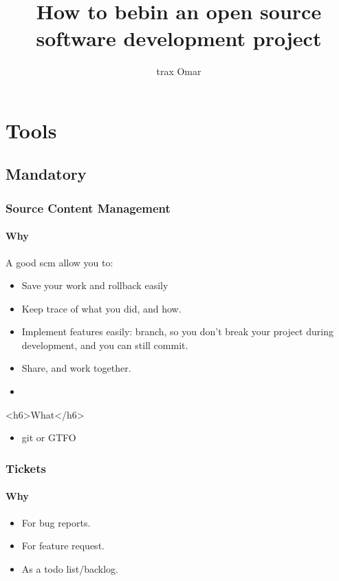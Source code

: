 \documentclass[a4paper, 12pt, twoside, openright]{article}
\author {trax Omar \bsc{Givernaud}}
\title{How to bebin an open source software development project}
\begin{document}
\maketitle
\thispagestyle{empty}
\clearpage
\tableofcontents{}
\thispagestyle{empty}
\clearpage

  \section{Tools}

  \subsection{Mandatory}
  \subsubsection{Source Content Management}

  \paragraph{Why}

  A good scm allow you to: 
  \begin{itemize}
    \item Save your work and rollback easily
    \item Keep trace of what you did, and how.
    \item Implement features easily: branch, 
      so you don't break your project during development, and you can still commit.
    \item Share, and work together.
    \item 
  \end{itemize}

  <h6>What</h6>

  \begin{itemize}\item git or GTFO\end{itemize}

  \subsubsection{Tickets}

  \paragraph{Why}

  \begin{itemize}
    \item For bug reports.
    \item For feature request.
    \item As a todo list/backlog.
  \end{itemize}
\end{document}
